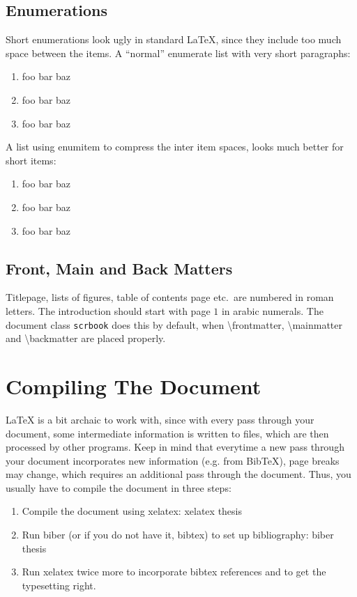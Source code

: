 \documentclass[8pt, %
a5paper, %
twoside, %
openright, %
abstract=off, %
DIV=11,      %
BCOR=8mm]{scrbook} %
\begin{document}
    \subsection{Enumerations}

    Short enumerations look ugly in  standard \LaTeX{}, since they include 
    too much  space between the  items.  A ``normal'' enumerate  list with 
    very short paragraphs:                                                 
    \begin{enumerate}
        \item foo bar baz
        \item foo bar baz
        \item foo bar baz
    \end{enumerate}

    A list using enumitem to compress the inter item spaces, looks much better for short items:
    \begin{enumerate}[noitemsep]
        \item foo bar baz
        \item foo bar baz
        \item foo bar baz
    \end{enumerate}

    \subsection{Front, Main and Back Matters}

    Titlepage, lists of figures, table of contents page etc.\ are numbered 
    in  roman letters.   The introduction  should start  with page  $1$ in 
    arabic  numerals.   The document  class  \verb+scrbook+  does this  by 
    default,  when \textbackslash  frontmatter, \textbackslash  mainmatter 
    and \textbackslash backmatter are placed properly.                     



    \section{Compiling The Document}
    \LaTeX{}  is  a bit  archaic  to  work  with,  since with  every  pass 
    through  your document,  some intermediate  information is  written to 
    files,  which are  then processed  by  other programs.   Keep in  mind 
    that  everytime a  new  pass through  your  document incorporates  new 
    information (e.g. from BibTeX), page breaks may change, which requires
    an  additional pass  through the  document. Thus, you  usually have  to
    compile the document in three steps:
    \begin{enumerate}
        \item Compile the document using xelatex: xelatex thesis
        \item Run biber  (or if  you do  not have  it, bibtex)  to set  up
              bibliography: biber thesis
        \item Run xelatex  twice more to incorporate  bibtex references and
              to get the typesetting right.
    \end{enumerate}
\end{document}
